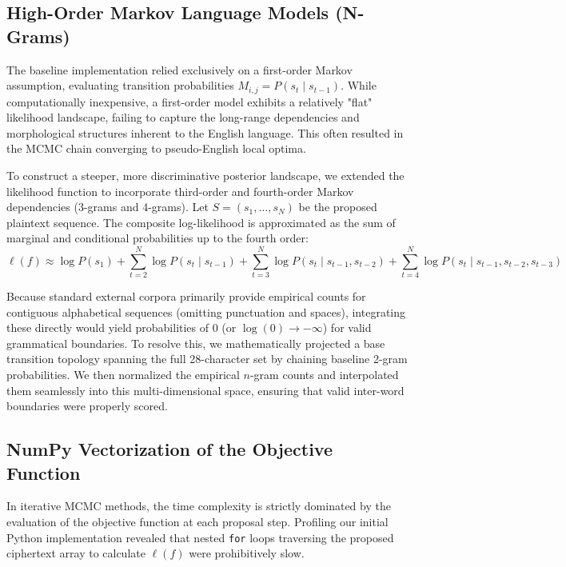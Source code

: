 \documentclass[11pt]{article}
\begin{document}
\subsection{High-Order Markov Language Models (N-Grams)}
The baseline implementation relied exclusively on a first-order Markov assumption, evaluating transition probabilities $M_{i,j} = P(s_t \mid s_{t-1})$. While computationally inexpensive, a first-order model exhibits a relatively "flat" likelihood landscape, failing to capture the long-range dependencies and morphological structures inherent to the English language. This often resulted in the MCMC chain converging to pseudo-English local optima.

To construct a steeper, more discriminative posterior landscape, we extended the likelihood function to incorporate third-order and fourth-order Markov dependencies (3-grams and 4-grams). Let $S = (s_1, \dots, s_N)$ be the proposed plaintext sequence. The composite log-likelihood is approximated as the sum of marginal and conditional probabilities up to the fourth order:
\begin{equation}
    \ell(f) \approx \log P(s_1) + \sum_{t=2}^{N} \log P(s_t \mid s_{t-1}) + \sum_{t=3}^N \log P(s_t \mid s_{t-1}, s_{t-2}) + \sum_{t=4}^N \log P(s_t \mid s_{t-1}, s_{t-2}, s_{t-3})
\end{equation}

Because standard external corpora primarily provide empirical counts for contiguous alphabetical sequences (omitting punctuation and spaces), integrating these directly would yield probabilities of $0$ (or $\log(0) \to -\infty$) for valid grammatical boundaries. To resolve this, we mathematically projected a base transition topology spanning the full 28-character set by chaining baseline 2-gram probabilities. We then normalized the empirical $n$-gram counts and interpolated them seamlessly into this multi-dimensional space, ensuring that valid inter-word boundaries were properly scored.

\subsection{NumPy Vectorization of the Objective Function}
In iterative MCMC methods, the time complexity is strictly dominated by the evaluation of the objective function at each proposal step. Profiling our initial Python implementation revealed that nested \texttt{for} loops traversing the proposed ciphertext array to calculate $\ell(f)$ were prohibitively slow. 
\end{document}
